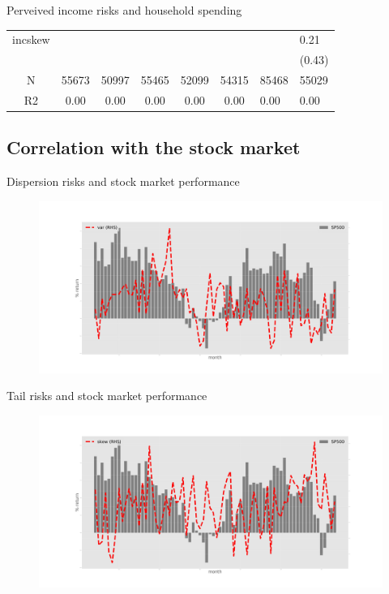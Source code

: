 \documentclass{beamer}
\begin{document}
\begin{frame}{Perveived income risks and household spending}
\begin{table}
{\begin{tabular}{ccccccll}
		incskew   &            &             &              &               &                &                 &             0.21 \\
		&            &             &              &               &                &                 &           (0.43) \\
		\hline 
		N         &      55673 &       50997 &        55465 &         52099 &          54315 &           85468 &            55029 \\
		R2        &       0.00 &        0.00 &         0.00 &          0.00 &           0.00 &            0.00 &             0.00 \\
		\hline 
	\end{tabular}
		}
	\end{table}
\end{frame}


\subsection{Correlation with the stock market}


\begin{frame}{Dispersion risks and stock market performance}
	\begin{figure}
		\centering
		\label{ts_var}
		\includegraphics[width=\textwidth]{figures/tsMeanvar.jpg}
	\end{figure}
\end{frame}



\begin{frame}{Tail risks and stock market performance}
	\begin{figure}
		\centering 
		\label{ts_skew}
		\includegraphics[width=\textwidth]{figures/tsEstMeanskew.jpg}
	\end{figure}
\end{frame}
\end{document}
